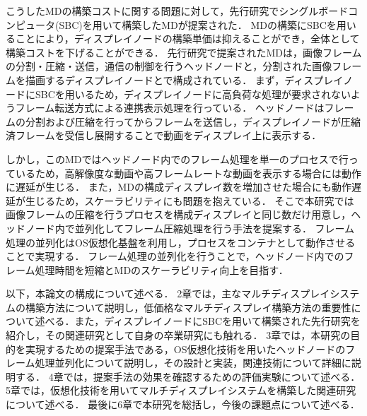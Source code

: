 こうしたMDの構築コストに関する問題に対して，先行研究でシングルボードコンピュータ(SBC)を用いて構築したMDが提案された．
MDの構築にSBCを用いることにより，ディスプレイノードの構築単価は抑えることができ，全体として構築コストを下げることができる．
先行研究で提案されたMDは，画像フレームの分割・圧縮・送信，通信の制御を行うヘッドノードと，分割された画像フレームを描画するディスプレイノードとで構成されている．
まず，ディスプレイノードにSBCを用いるため，ディスプレイノードに高負荷な処理が要求されないようフレーム転送方式による連携表示処理を行っている．
ヘッドノードはフレームの分割および圧縮を行ってからフレームを送信し，ディスプレイノードが圧縮済フレームを受信し展開することで動画をディスプレイ上に表示する．

しかし，このMDではヘッドノード内でのフレーム処理を単一のプロセスで行っているため，高解像度な動画や高フレームレートな動画を表示する場合には動作に遅延が生じる．
また，MDの構成ディスプレイ数を増加させた場合にも動作遅延が生じるため，スケーラビリティにも問題を抱えている．
そこで本研究では画像フレームの圧縮を行うプロセスを構成ディスプレイと同じ数だけ用意し，ヘッドノード内で並列化してフレーム圧縮処理を行う手法を提案する．
フレーム処理の並列化はOS仮想化基盤を利用し，プロセスをコンテナとして動作させることで実現する．
フレーム処理の並列化を行うことで，ヘッドノード内でのフレーム処理時間を短縮とMDのスケーラビリティ向上を目指す．

以下，本論文の構成について述べる．
2章では，主なマルチディスプレイシステムの構築方法について説明し，低価格なマルチディスプレイ構築方法の重要性について述べる．また，ディスプレイノードにSBCを用いて構築された先行研究を紹介し，その関連研究として自身の卒業研究にも触れる．
3章では，本研究の目的を実現するための提案手法である，OS仮想化技術を用いたヘッドノードのフレーム処理並列化について説明し，その設計と実装，関連技術について詳細に説明する．
4章では，提案手法の効果を確認するための評価実験について述べる．
5章では，仮想化技術を用いてマルチディスプレイシステムを構築した関連研究について述べる．
最後に6章で本研究を総括し，今後の課題点について述べる．